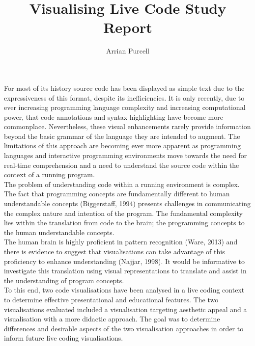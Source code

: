 \documentclass{article}
\begin{document}
\title{Visualising Live Code Study Report}
\author{Arrian Purcell}

\maketitle



For most of its history source code has been displayed as simple text due to the expressiveness of this format, despite its inefficiencies. It is only recently, due to ever increasing programming language complexity and increasing computational power, that code annotations and syntax highlighting have become more commonplace. Nevertheless, these visual enhancements rarely provide information beyond the basic grammar of the language they are intended to augment. The limitations of this approach are becoming ever more apparent as programming languages and interactive programming environments move towards the need for real-time comprehension and a need to understand the source code within the context of a running program.\\

The problem of understanding code within a running environment is complex. The fact that programming concepts are fundamentally different to human understandable concepts (Biggerstaff, 1994) presents challenges in communicating the complex nature and intention of the program. The fundamental complexity lies within the translation from code to the brain; the programming concepts to the human understandable concepts.\\

The human brain is highly proficient in pattern recognition (Ware, 2013) and there is evidence to suggest that visualisations can take advantage of this proficiency to enhance understanding (Najjar, 1998). It would be informative to investigate this translation using visual representations to translate and assist in the understanding of program concepts.\\

To this end, two code visualisations have been analysed in a live coding context to determine effective presentational and educational features. The two visualisations evaluated included a visualisation targeting aesthetic appeal and a visualisation with a more didactic approach. The goal was to determine differences and desirable aspects of the two visualisation approaches in order to inform future live coding visualisations.\\
\end{document}
